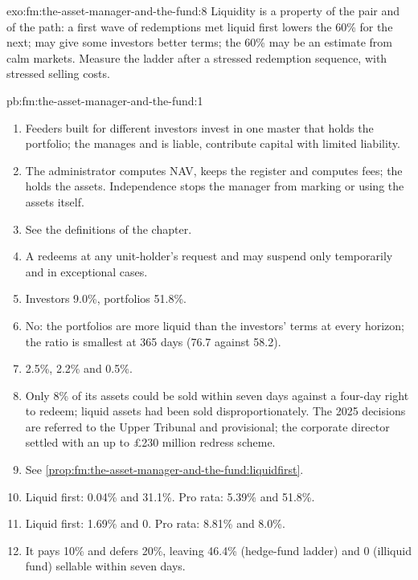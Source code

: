 \begin{solution}{exo:fm:the-asset-manager-and-the-fund:8}
Liquidity is a property of the pair and of the path: a first wave of redemptions met liquid first lowers the 60\% for the next;  may
give some investors better terms; the 60\% may be an estimate from calm markets. Measure the ladder after a stressed redemption sequence, with
stressed selling costs.
\end{solution}

\begin{solution}{pb:fm:the-asset-manager-and-the-fund:1}
\begin{enumerate}
\item Feeders built for different investors invest in one master that holds the portfolio; the  manages and is liable,  contribute capital with limited liability.
\item The administrator computes NAV, keeps the register and computes fees; the  holds the assets. Independence stops the manager from
marking or using the assets itself.
\item See the definitions of the chapter.
\item A  redeems at any unit-holder's request and may suspend only temporarily and in exceptional cases.
\item Investors 9.0\%, portfolios 51.8\%.
\item No: the portfolios are more liquid than the investors' terms at every horizon; the ratio is smallest at 365 days (76.7 against 58.2).
\item 2.5\%, 2.2\% and 0.5\%.
\item Only 8\% of its assets could be sold within seven days against a four-day right to redeem; liquid assets had been sold disproportionately.
The 2025 decisions are referred to the Upper Tribunal and provisional; the corporate director settled with an up to £230 million redress scheme.
\item See \cref{prop:fm:the-asset-manager-and-the-fund:liquidfirst}.
\item Liquid first: 0.04\% and 31.1\%. Pro rata: 5.39\% and 51.8\%.
\item Liquid first: 1.69\% and 0. Pro rata: 8.81\% and 8.0\%.
\item It pays 10\% and defers 20\%, leaving 46.4\% (hedge-fund ladder) and 0 (illiquid fund) sellable within seven days.

\end{enumerate}
\end{solution}
